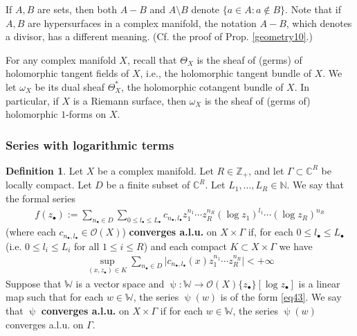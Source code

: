 \documentclass[11pt,b5paper,notitlepage]{article}
\theoremstyle{definition}
\newtheorem{df}{Definition}[section]
\theoremstyle{plain}
\newcommand{\blt}{\bullet}
\newcommand{\Wbb}{\mathbb W}
\newcommand{\Cbb}{\mathbb C}
\newcommand{\Nbb}{\mathbb N}
\newcommand{\Zbb}{\mathbb Z}
\newcommand{\<}{\left\langle}
\renewcommand{\>}{\right\rangle}
\newcommand{\MO}{\mathcal{O}}
\numberwithin{equation}{section}
\begin{document}
If $A,B$ are sets, then both $A-B$ and $A\setminus B$ denote $\{a\in A:a\notin B\}$. Note that if $A,B$ are hypersurfaces in a complex manifold, the notation $A-B$, which denotes a divisor, has a different meaning. (Cf. the proof of Prop. \ref{geometry10}.)

For any complex manifold $X$, recall that $\Theta_X$ is the sheaf of (germs) of holomorphic tangent fields of $X$, i.e., the holomorphic tangent bundle of $X$. We let $\omega_X$ be its dual sheaf $\Theta_X^*$, the holomorphic cotangent bundle of $X$. In particular, if $X$ is a Riemann surface, then $\omega_X$ is the sheaf of (germs of) holomorphic $1$-forms on $X$.







\subsubsection{Series with logarithmic terms}





\begin{df}\label{lb19}
Let $X$ be a complex manifold. Let $R\in\Zbb_+$, and let $\Gamma\subset\Cbb^R$ be locally compact. Let $D$ be a finite subset of $\Cbb^R$. Let $L_1,\dots,L_R\in\Nbb$. We say that  the formal series
\begin{align}\label{eq43}
f(z_\blt):=        \sum_{n_\blt\in D}\sum_{0\leq l_\blt\leq L_\blt}c_{n_\blt,l_\blt} z_1^{n_1}\cdots z_R^{n_R} (\log z_1)^{l_1}\cdots(\log z_R)^{n_R}
    \end{align}
(where each $c_{n_\blt,l_\blt}\in \MO(X)$) \textbf{converges a.l.u.} on $X\times\Gamma$ if, for each $0\leq l_\blt\leq L_\blt$ (i.e. $0\leq l_i\leq L_i$ for all $1\leq i\leq R$) and each compact $K\subset X\times\Gamma$  we have
\begin{align}\label{eq29}
\sup_{(x,z_\blt)\in K}\sum_{n_\blt\in D}\big|c_{n_\blt,l_\blt}(x) z_1^{n_1}\cdots z_R^{n_R}\big|<+\infty
\end{align}
Suppose that $\Wbb$ is a vector space and $\uppsi:\Wbb\rightarrow\MO(X)\{z_\blt\}[\log z_\blt]$ is a linear map such that for each $w\in\Wbb$, the series $\uppsi(w)$ is of the form \eqref{eq43}. We say that $\uppsi$ \textbf{converges a.l.u.} on $X\times\Gamma$ if for each $w\in\Wbb$, the series $\uppsi(w)$ converges a.l.u. on $\Gamma$.
\end{df}
\end{document}
